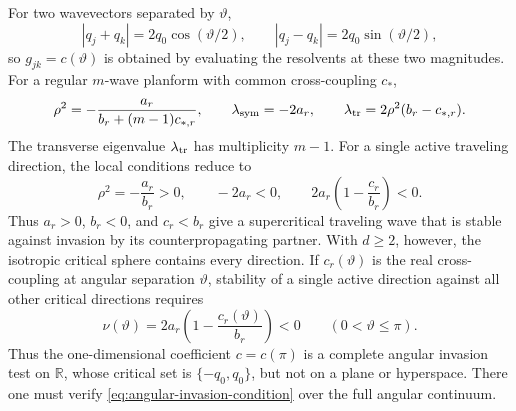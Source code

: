 \documentclass[11pt]{article}
\begin{document}
For two wavevectors separated by $\vartheta$,
\begin{equation}
 |q_j+q_k|=2q_0\cos(\vartheta/2),\qquad
 |q_j-q_k|=2q_0\sin(\vartheta/2),
\end{equation}
so $g_{jk}=c(\vartheta)$ is obtained by evaluating the resolvents at these
two magnitudes.  For a regular $m$-wave planform with common cross-coupling
$c_*$,
\begin{equation}
 \rho^2=-\frac{a_r}{b_r+(m-1)c_{*,r}},\qquad
 \lambda_{\rm sym}=-2a_r,\qquad
 \lambda_{\rm tr}=2\rho^2(b_r-c_{*,r}).
 \label{eq:Rd-regular-planform}
\end{equation}
The transverse eigenvalue $\lambda_{\rm tr}$ has multiplicity $m-1$.
For a single active traveling direction, the local conditions reduce to
\begin{equation}
 \rho^2=-\frac{a_r}{b_r}>0,
 \qquad
 -2a_r<0,
 \qquad
 2a_r\left(1-\frac{c_r}{b_r}\right)<0.
 \label{eq:single-wave-local-condition}
\end{equation}
Thus $a_r>0$, $b_r<0$, and $c_r<b_r$ give a supercritical traveling wave
that is stable against invasion by its counterpropagating partner.  With
$d\geq2$, however, the isotropic critical sphere contains every direction.
If $c_r(\vartheta)$ is the real cross-coupling at angular separation
$\vartheta$, stability of a single active direction against all other
critical directions requires
\begin{equation}
 \nu(\vartheta)=2a_r\left(1-
 \frac{c_r(\vartheta)}{b_r}\right)<0
 \qquad(0<\vartheta\leq\pi).
 \label{eq:angular-invasion-condition}
\end{equation}
Thus the one-dimensional coefficient $c=c(\pi)$ is a complete angular
invasion test on $\mathbb R$, whose critical set is $\{-q_0,q_0\}$, but not
on a plane or hyperspace.  There one must verify
\eqref{eq:angular-invasion-condition} over the full angular continuum.
\end{document}
